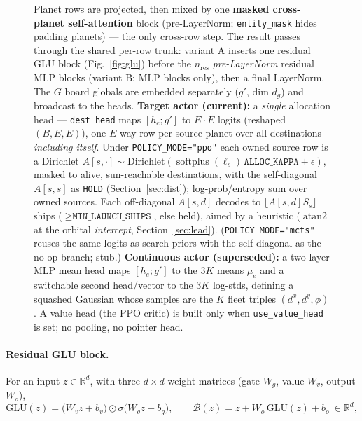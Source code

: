 \documentclass[11pt]{article}
\newcommand{\R}{\mathbb{R}}
\begin{document}
\begin{figure}[h]
{Planet rows are projected, then mixed by one \textbf{masked cross-planet self-attention} block
(pre-LayerNorm; \texttt{entity\_mask} hides padding planets) --- the only cross-row step. The result
passes through the shared per-row trunk: variant A inserts one residual GLU block (Fig.~\ref{fig:glu})
before the $n_{\mathrm{res}}$ \emph{pre-LayerNorm} residual MLP blocks (variant B: MLP blocks only),
then a final LayerNorm. The $G$ board globals are embedded separately ($g'$, dim $d_g$) and broadcast
to the heads. \textbf{Target actor (current):} a \emph{single} allocation head ---
\texttt{dest\_head} maps $[h_e;g']$ to $E{\cdot}E$ logits (reshaped $(B,E,E)$), one $E$-way row per
source planet over all destinations \emph{including itself}. Under \texttt{POLICY\_MODE="ppo"} each
owned source row is a Dirichlet $A[s,\cdot]\sim\mathrm{Dirichlet}(\operatorname{softplus}(\ell_s)\,
\texttt{ALLOC\_KAPPA}{+}\epsilon)$, masked to alive, sun-reachable destinations, with the self-diagonal
$A[s,s]$ as \texttt{HOLD} (Section~\ref{sec:dist}); log-prob/entropy sum over owned sources. Each
off-diagonal $A[s,d]$ decodes to $\lfloor A[s,d]S_s\rfloor$ ships ($\ge\texttt{MIN\_LAUNCH\_SHIPS}$,
else held), aimed by a heuristic ($\operatorname{atan2}$ at the orbital \emph{intercept},
Section~\ref{sec:lead}). (\texttt{POLICY\_MODE="mcts"} reuses the same logits as search priors with the
self-diagonal as the no-op branch; stub.) \textbf{Continuous actor
(superseded):} a two-layer MLP mean head maps $[h_e;g']$ to the $3K$ means $\mu_e$ and a switchable
second head/vector to the $3K$ log-stds, defining a squashed Gaussian whose samples are the $K$ fleet
triples $(d^x,d^y,\phi)$. A value head (the PPO critic) is built only when \texttt{use\_value\_head} is
set; no pooling, no pointer head.}
\label{fig:arch}
\end{figure}

\paragraph{Residual GLU block.} For an input $z\in\R^{d}$, with three $d\times d$ weight
matrices (gate $W_g$, value $W_v$, output $W_o$),
\begin{equation}
\mathrm{GLU}(z) = \big(W_v z + b_v\big)\odot \sigma\!\big(W_g z + b_g\big),
\qquad
\mathcal{B}(z) = z + W_o\,\mathrm{GLU}(z) + b_o \ \in\R^{d},
\label{eq:glu}
\end{equation}
\end{document}
